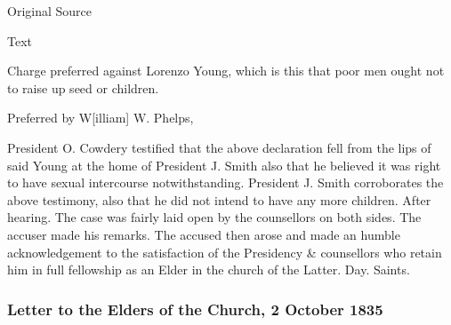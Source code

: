 			
			\begin{description}
				\item[Original Source]
			\end{description}
			
			
			\begin{description}
				\item[Text]
			\end{description}
			
				Charge preferred against Lorenzo Young, which is this that poor men ought not to raise up seed or children.
				
				Preferred by W[illiam] W. Phelps,
				
				President O. Cowdery testified that the above declaration fell from the lips of said Young at the home of President J. Smith  also that he believed it was right to have sexual intercourse notwithstanding. President J. Smith  corroborates the above testimony, also that he did not intend to have any more children. After hearing. The case was fairly laid open by the counsellors on both sides. The accuser made his remarks. The accused then arose and made an humble acknowledgement to the satisfaction of the Presidency \& counsellors who retain him in full fellowship as an Elder in the church of the Latter. Day. Saints.
				
		\subsubsection{Letter to the Elders of the Church, 2 October 1835}
			\label{EMS-1835-JS-2-OCT-1835}
			
